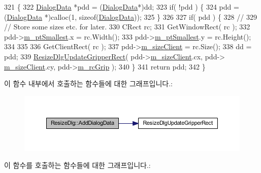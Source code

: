\begin{DoxyCode}
321 \{
322   \mbox{\hyperlink{struct_dialog_data}{DialogData}} *pdd = (\mbox{\hyperlink{struct_dialog_data}{DialogData}}*)dd;
323   \textcolor{keywordflow}{if}( !pdd ) \{
324     pdd = (\mbox{\hyperlink{struct_dialog_data}{DialogData}} *)calloc(1, \textcolor{keyword}{sizeof}(\mbox{\hyperlink{struct_dialog_data}{DialogData}}));
325   \}
326   
327   \textcolor{keywordflow}{if}( pdd ) \{
328     \textcolor{comment}{//}
329     \textcolor{comment}{//  Store some sizes etc. for later.}
330     CRect rc;
331     GetWindowRect( rc );
332     pdd->\mbox{\hyperlink{struct_dialog_data_a48eb19417544d0c6ddfd1bd9c03cd2e5}{m\_ptSmallest}}.x = rc.Width();
333     pdd->\mbox{\hyperlink{struct_dialog_data_a48eb19417544d0c6ddfd1bd9c03cd2e5}{m\_ptSmallest}}.y = rc.Height();
334     
335     
336     GetClientRect( rc );
337     pdd->\mbox{\hyperlink{struct_dialog_data_af63c4c59aa42a272798f9af446fc4484}{m\_sizeClient}} = rc.Size();
338     dd = pdd;
339     \mbox{\hyperlink{_resize_dlg_8cpp_af86ee86600de84824a5d7b8b3aaed6e8}{ResizeDlgUpdateGripperRect}}( pdd->\mbox{\hyperlink{struct_dialog_data_af63c4c59aa42a272798f9af446fc4484}{m\_sizeClient}}.cx, pdd->
      \mbox{\hyperlink{struct_dialog_data_af63c4c59aa42a272798f9af446fc4484}{m\_sizeClient}}.cy, pdd->\mbox{\hyperlink{struct_dialog_data_a3d543e5db55fefcd025e18f74558de8d}{m\_rcGrip}} );
340   \}
341   \textcolor{keywordflow}{return} pdd;
342 \}
\end{DoxyCode}
이 함수 내부에서 호출하는 함수들에 대한 그래프입니다.\+:
\nopagebreak
\begin{figure}[H]
\begin{center}
\leavevmode
\includegraphics[width=350pt]{class_resize_dlg_a5657ce3f83f261aceaf138cd1c69f0fc_cgraph}
\end{center}
\end{figure}
이 함수를 호출하는 함수들에 대한 그래프입니다.\+:
\nopagebreak
